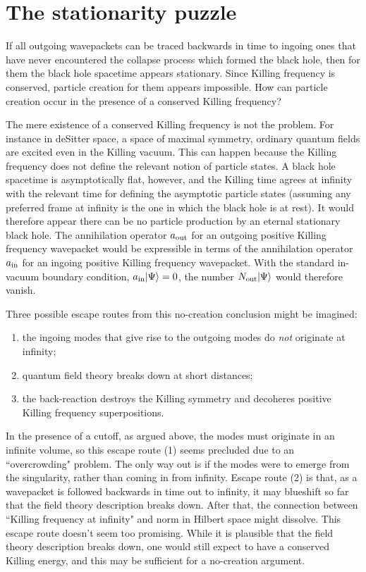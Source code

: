 \section{The stationarity puzzle}

If all outgoing wavepackets can be traced backwards in time to ingoing
ones that have never encountered the collapse process which formed the
black hole, then for them the black hole spacetime appears stationary.
Since Killing frequency is conserved, particle creation for them
appears impossible. How can particle creation occur in the presence of
a conserved Killing frequency?

The mere existence of a conserved Killing frequency is not the
problem.  For instance in deSitter space, a space of maximal symmetry,
ordinary quantum fields are excited even in the Killing
vacuum\cite{GibbHawk}. This can happen because the Killing frequency
does not define the relevant notion of particle states. A black hole
spacetime is asymptotically flat, however, and the Killing time agrees
at infinity with the relevant time for defining the asymptotic particle
states (assuming any preferred frame at infinity is the one in which
the black hole is at rest).  It would therefore appear there can be no
particle production by an eternal stationary black hole. The
annihilation operator $a_{\rm out}$ for an outgoing positive Killing
frequency wavepacket would be expressible in terms of the annihilation
operator $a_{\rm in}$ for an ingoing positive Killing frequency
wavepacket. With the standard in-vacuum boundary condition, $a_{\rm
in}|\Psi\rangle=0$, the number $N_{\rm out}|\Psi\rangle$ would
therefore vanish.

Three possible escape routes from this no-creation conclusion might be
imagined:  \begin{enumerate} \item the ingoing modes that give rise to
the outgoing modes do {\it not} originate at infinity; \item quantum
field theory breaks down at short distances; \item the back-reaction
destroys the Killing symmetry and decoheres positive Killing frequency
superpositions.  \end{enumerate} In the presence of a cutoff, as argued
above, the modes must originate in an infinite volume, so this escape
route (1) seems precluded due to an ``overcrowding" problem. The only
way out is if the modes were to emerge from the singularity, rather
than coming in from infinity.  Escape route (2) is that, as a
wavepacket is followed backwards in time out to infinity, it may
blueshift so far that the field theory description breaks down. After
that, the connection between ``Killing frequency at infinity" and norm
in Hilbert space might dissolve.  This escape route doesn't seem too
promising.  While it is plausible that the field theory description
breaks down, one would still expect to have a conserved Killing energy,
and this may be sufficient for a no-creation argument.

